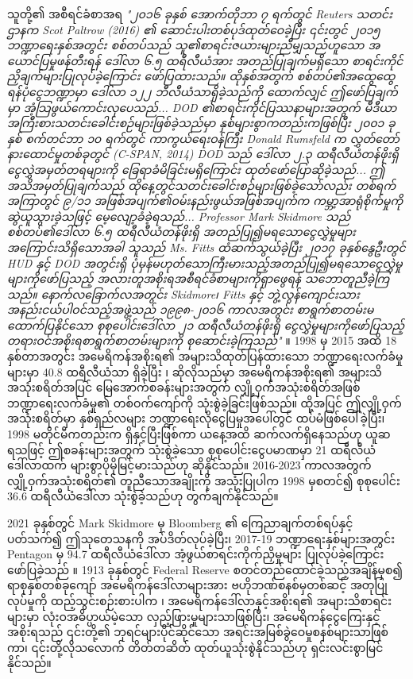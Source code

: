\documentclass[10pt,twocolumn,letterpaper]{article}
\begin{document}
သူတို့၏ အစီရင်ခံစာအရ \textit{"၂၀၁၆ ခုနှစ် အောက်တိုဘာ ၇ ရက်တွင် Reuters သတင်းဌာနက Scot Paltrow (2016) ၏ ဆောင်းပါးတစ်ပုဒ်ထုတ်ဝေခဲ့ပြီး ၎င်းတွင် ၂၀၁၅ ဘဏ္ဍာရေးနှစ်အတွင်း စစ်တပ်သည် သူ၏စာရင်းဇယားများညီမျှသည်ဟူသော အယောင်ပြမှုဖန်တီးရန် ဒေါ်လာ ၆.၅ ထရီလီယံအား အတည်ပြုချက်မရှိသော စာရင်းကိုင်ညှိချက်များပြုလုပ်ခဲ့ကြောင်း ဖော်ပြထားသည်။ ထိုနှစ်အတွက် စစ်တပ်၏အထွေထွေရန်ပုံငွေဘဏ္ဍာမှာ ဒေါ်လာ ၁၂၂ ဘီလီယံသာရှိခဲ့သည်ကို ထောက်လျှင် ဤဖော်ပြချက်မှာ အံ့သြဖွယ်ကောင်းလှပေသည်... DOD ၏စာရင်းကိုင်ပြဿနာများအတွက် မီဒီယာအကြီးစားသတင်းခေါင်းစဉ်များဖြစ်ခဲ့သည်မှာ နှစ်များစွာကတည်းကဖြစ်ပြီး ၂၀၀၁ ခုနှစ် စက်တင်ဘာ ၁၀ ရက်တွင် ကာကွယ်ရေးဝန်ကြီး Donald Rumsfeld က လွှတ်တော်နားထောင်မှုတစ်ခုတွင် (C-SPAN, 2014) DOD သည် ဒေါ်လာ ၂.၃ ထရီလီယံတန်ဖိုးရှိ ငွေလွှဲအမှတ်တရများကို ခြေရာခံမိခြင်းမရှိကြောင်း ထုတ်ဖော်ပြောဆိုခဲ့သည်... ဤအသိအမှတ်ပြုချက်သည် ထိုနေ့တွင်သတင်းခေါင်းစဉ်များဖြစ်ခဲ့သော်လည်း တစ်ရက်အကြာတွင် ၉/၁၁ အဖြစ်အပျက်၏ဝမ်းနည်းဖွယ်အဖြစ်အပျက်က ကမ္ဘာ့အာရုံစိုက်မှုကိုဆွဲယူသွားခဲ့သဖြင့် မေ့လျော့ခံခဲ့ရသည်... Professor Mark Skidmore သည် စစ်တပ်၏ဒေါ်လာ ၆.၅ ထရီလီယံတန်ဖိုးရှိ အတည်ပြု၍မရသောငွေလွှဲမှုများအကြောင်းသိရှိသောအခါ သူသည် Ms. Fitts ထံဆက်သွယ်ခဲ့ပြီး ၂၀၁၇ ခုနှစ်နွေဦးတွင် HUD နှင့် DOD အတွင်းရှိ ပုံမှန်မဟုတ်သောကြီးမားသည့်အတည်ပြု၍မရသောငွေလွှဲမှုများကိုဖော်ပြသည့် အလားတူအစိုးရအစီရင်ခံစာများကိုရှာဖွေရန် သဘောတူညီခဲ့ကြသည်။ နောက်လခြောက်လအတွင်း Skidmore၊ Fitts နှင့် ဘွဲ့လွန်ကျောင်းသားအနည်းငယ်ပါဝင်သည့်အဖွဲ့သည် ၁၉၉၈-၂၀၁၆ ကာလအတွင်း စာရွက်စာတမ်းမထောက်ပြနိုင်သော စုစုပေါင်းဒေါ်လာ ၂၁ ထရီလီယံတန်ဖိုးရှိ ငွေလွှဲမှုများကိုဖော်ပြသည့် တရားဝင်အစိုးရစာရွက်စာတမ်းများကို စုဆောင်းခဲ့ကြသည်"} \cite{12}။
1998 မှ 2015 အထိ 18 နှစ်တာအတွင်း အမေရိကန်အစိုးရ၏ အများသိထုတ်ပြန်ထားသော ဘဏ္ဍာရေးလက်ခံမှုများမှာ 40.8 ထရီလီယံသာ ရှိခဲ့ပြီး \cite{15}၊ ဆိုလိုသည်မှာ အမေရိကန်အစိုးရ၏ အများသိအသုံးစရိတ်အပြင် မြေအောက်စခန်းများအတွက် လျှို့ဝှက်အသုံးစရိတ်အဖြစ် ဘဏ္ဍာရေးလက်ခံမှု၏ တစ်ဝက်ကျော်ကို သုံးစွဲခဲ့ခြင်းဖြစ်သည်။ ထို့အပြင် ဤလျှို့ဝှက်အသုံးစရိတ်မှာ နှစ်ရှည်လများ ဘဏ္ဍာရေးလိုငွေပြမှုအပေါ်တွင် ထပ်မံဖြစ်ပေါ်ခဲ့ပြီး၊ 1998 မတိုင်မီကတည်းက ရှိနှင့်ပြီးဖြစ်ကာ ယနေ့အထိ ဆက်လက်ရှိနေသည်ဟု ယူဆရသဖြင့် ဤစခန်းများအတွက် သုံးစွဲခဲ့သော စုစုပေါင်းငွေပမာဏမှာ 21 ထရီလီယံဒေါ်လာထက် များစွာပိုမိုမြင့်မားသည်ဟု ဆိုနိုင်သည်။ 2016-2023 ကာလအတွက် လျှို့ဝှက်အသုံးစရိတ်၏ တူညီသောအချိုးကို အသုံးပြုပါက 1998 မှစတင်၍ စုစုပေါင်း 36.6 ထရီလီယံဒေါ်လာ သုံးစွဲခဲ့သည်ဟု တွက်ချက်နိုင်သည်။

2021 ခုနှစ်တွင် Mark Skidmore မှ Bloomberg ၏ ကြေညာချက်တစ်ရပ်နှင့်ပတ်သက်၍ ဤသုတေသနကို အပ်ဒိတ်လုပ်ခဲ့ပြီး၊ 2017-19 ဘဏ္ဍာရေးနှစ်များအတွင်း Pentagon မှ 94.7 ထရီလီယံဒေါ်လာ အံ့ဖွယ်စာရင်းကိုက်ညှိမှုများ ပြုလုပ်ခဲ့ကြောင်း ဖော်ပြခဲ့သည် \cite{17,18}။ 1913 ခုနှစ်တွင် Federal Reserve စတင်တည်ထောင်ခဲ့သည့်အချိန်မှစ၍ ရာစုနှစ်တစ်ခုကျော် အမေရိကန်ဒေါ်လာများအား ဗဟိုဘဏ်စနစ်မှတစ်ဆင့် အတုပြုလုပ်မှုကို ထည့်သွင်းစဉ်းစားပါက \cite{37}၊ အမေရိကန်ဒေါ်လာနှင့်အစိုးရ၏ အများသိစာရင်းများမှာ လုံးဝအဓိပ္ပာယ်မဲ့သော လှည့်ဖြားမှုများသာဖြစ်ပြီး၊ အမေရိကန်ငွေကြေးနှင့်အစိုးရသည် ၎င်းတို့၏ ဘုရင်များပိုင်ဆိုင်သော အရင်းအမြစ်ခွဲဝေမှုစနစ်များသာဖြစ်ကာ၊ ၎င်းတို့လိုသလောက် တိတ်တဆိတ် ထုတ်ယူသုံးစွဲနိုင်သည်ဟု ရှင်းလင်းစွာမြင်နိုင်သည်။
\end{document}
